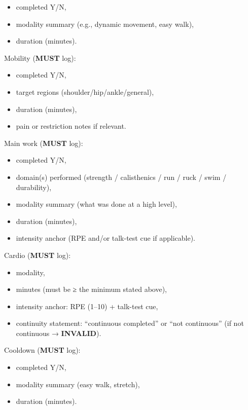 \documentclass[10pt]{article}
\begin{document}
\begin{itemize}
\item completed Y/N,
\item modality summary (e.g., dynamic movement, easy walk),
\item duration (minutes).
\end{itemize}

Mobility (\textbf{MUST} log):

\begin{itemize}
\item completed Y/N,
\item target regions (shoulder/hip/ankle/general),
\item duration (minutes),
\item pain or restriction notes if relevant.
\end{itemize}

Main work (\textbf{MUST} log):

\begin{itemize}
\item completed Y/N,
\item domain(s) performed (strength / calisthenics / run / ruck / swim / durability),
\item modality summary (what was done at a high level),
\item duration (minutes),
\item intensity anchor (RPE and/or talk-test cue if applicable).
\end{itemize}

Cardio (\textbf{MUST} log):

\begin{itemize}
\item modality,
\item minutes (must be ≥ the minimum stated above),
\item intensity anchor: RPE (1–10) + talk-test cue,
\item continuity statement: “continuous completed” or “not continuous” (if not continuous → \textbf{INVALID}).
\end{itemize}

Cooldown (\textbf{MUST} log):

\begin{itemize}
\item completed Y/N,
\item modality summary (easy walk, stretch),
\item duration (minutes).
\end{itemize}
\end{document}
